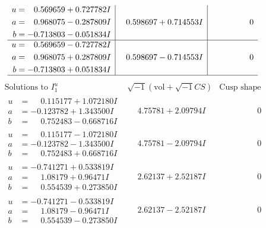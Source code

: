 \documentclass[1p]{elsarticle_modified}
\theoremstyle{definition}
\newcommand{\I}{\sqrt{-1}}
\begin{document}
$$\begin{array}{c|c|c}
\begin{aligned}
u &= \phantom{-}0.569659 + 0.727782 I \\
a &= \phantom{-}0.968075 - 0.287809 I \\
b &= -0.713803 - 0.051834 I\end{aligned}
 & \phantom{-}0.598697 + 0.714553 I & \phantom{-0.000000 } 0 \\ \hline\begin{aligned}
u &= \phantom{-}0.569659 - 0.727782 I \\
a &= \phantom{-}0.968075 + 0.287809 I \\
b &= -0.713803 + 0.051834 I\end{aligned}
 & \phantom{-}0.598697 - 0.714553 I & \phantom{-0.000000 } 0\\
 \hline 
 \end{array}$$\newpage$$\begin{array}{c|c|c}  
\text{Solutions to }I^u_{1}& \I (\text{vol} + \sqrt{-1}CS) & \text{Cusp shape}\\
 \hline 
\begin{aligned}
u &= \phantom{-}0.115177 + 1.072180 I \\
a &= -0.123782 + 1.343500 I \\
b &= \phantom{-}0.752483 - 0.668716 I\end{aligned}
 & \phantom{-}4.75781 + 2.09794 I & \phantom{-0.000000 } 0 \\ \hline\begin{aligned}
u &= \phantom{-}0.115177 - 1.072180 I \\
a &= -0.123782 - 1.343500 I \\
b &= \phantom{-}0.752483 + 0.668716 I\end{aligned}
 & \phantom{-}4.75781 - 2.09794 I & \phantom{-0.000000 } 0 \\ \hline\begin{aligned}
u &= -0.741271 + 0.533819 I \\
a &= \phantom{-}1.08179 + 0.96471 I \\
b &= \phantom{-}0.554539 + 0.273850 I\end{aligned}
 & \phantom{-}2.62137 + 2.52187 I & \phantom{-0.000000 } 0 \\ \hline\begin{aligned}
u &= -0.741271 - 0.533819 I \\
a &= \phantom{-}1.08179 - 0.96471 I \\
b &= \phantom{-}0.554539 - 0.273850 I\end{aligned}
 & \phantom{-}2.62137 - 2.52187 I & \phantom{-0.000000 } 0 \\ \hline\begin{aligned}

\end{aligned}
\end{array}$$
\end{document}
